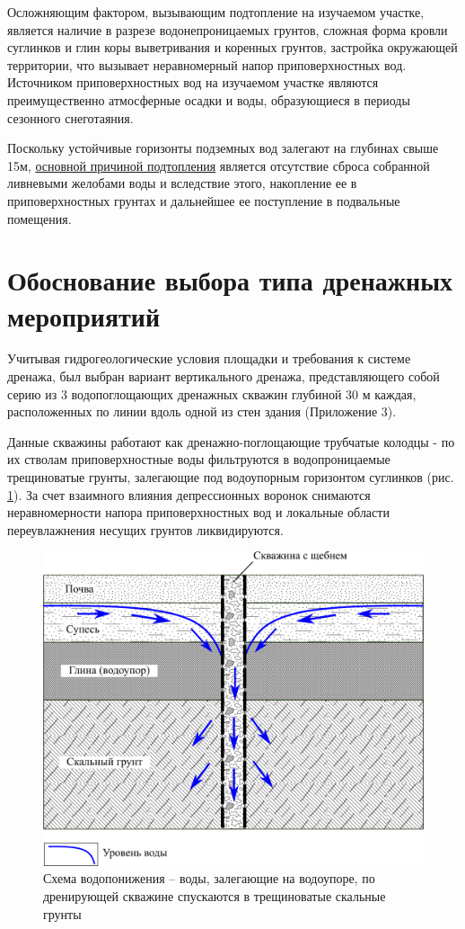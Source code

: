 \documentclass[a4paper,12pt]{article} %
\begin{document}
Осложняющим фактором, вызывающим подтопление на изучаемом участке, является наличие в разрезе водонепроницаемых грунтов, сложная форма кровли суглинков и глин коры выветривания и коренных грунтов, застройка окружающей территории, что вызывает неравномерный напор приповерхностных вод. Источником приповерхностных вод на изучаемом участке являются преимущественно атмосферные осадки и воды, образующиеся в периоды сезонного снеготаяния.

Поскольку устойчивые горизонты подземных вод залегают на глубинах свыше 15\-м, \underline{основной причиной подтопления} является отсутствие сброса собранной ливневыми желобами воды и вследствие этого, накопление ее в приповерхностных грунтах и дальнейшее ее поступление в подвальные помещения.

\section{Обоснование выбора типа дренажных мероприятий}

Учитывая гидрогеологические условия площадки и требования к системе дренажа, был выбран вариант вертикального дренажа, представляющего собой серию из 3 водопоглощающих дренажных скважин глубиной 30 м каждая, расположенных по линии вдоль одной из стен здания (Приложение 3). 

Данные скважины работают как дренажно-поглощающие трубчатые колодцы - по их стволам приповерхностные воды фильтруются в водопроницаемые трещиноватые грунты, залегающие под  водоупорным горизонтом суглинков (рис. \ref{img:scheme1}). За счет взаимного влияния депрессионных воронок снимаются неравномерности напора приповерхностных вод и локальные области переувлажнения несущих грунтов ликвидируются.

\begin{figure}[!h]
	\centering
	\includegraphics{img1.png}
	\caption[Схема водопонижения]{Схема водопонижения – воды, залегающие на водоупоре, по дренирующей скважине спускаются в трещиноватые скальные грунты}
	\label{img:scheme1}
\end{figure}
\end{document}
